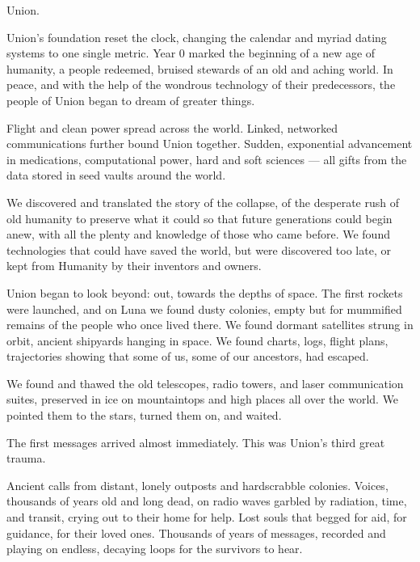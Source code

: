 Union. 
 

Union’s foundation reset the clock, changing the calendar and myriad dating systems to one  
single metric. Year 0 marked the beginning of a new age of humanity, a people redeemed,  
bruised stewards of an old and aching world. In peace, and with the help of the wondrous  
technology of their predecessors, the people of Union began to dream of greater things.
 

                                                                                                           


Flight and clean power spread across the world. Linked, networked communications further  
bound Union together. Sudden, exponential advancement in medications, computational power,  
hard and soft sciences — all gifts from the data stored in seed vaults around the world. 
 

We discovered and translated the story of the collapse, of the desperate rush of old humanity to  
preserve what it could so that future generations could begin anew, with all the plenty and  
knowledge of those who came before. We found technologies that could have saved the world,  
but were discovered too late, or kept from Humanity by their inventors and owners. 
 

Union began to look beyond: out, towards the depths of space. The first rockets were launched,  
and on Luna we found dusty colonies, empty but for mummified remains of the people who once  
lived there. We found dormant satellites strung in orbit, ancient shipyards hanging in space. We  
found charts, logs, flight plans, trajectories showing that some of us, some of our ancestors, had  
escaped. 
 

We found and thawed the old telescopes, radio towers, and laser communication suites,  
preserved in ice on mountaintops and high places all over the world. We pointed them to the  
stars, turned them on, and waited.  
 

The first messages arrived almost immediately. This was Union’s third great trauma. 
 

Ancient calls from distant, lonely outposts and hardscrabble colonies. Voices, thousands of years  
old and long dead, on radio waves garbled by radiation, time, and transit, crying out to their  
home for help. Lost souls that begged for aid, for guidance, for their loved ones. Thousands of  
years of messages, recorded and playing on endless, decaying loops for the survivors to hear. 
 

